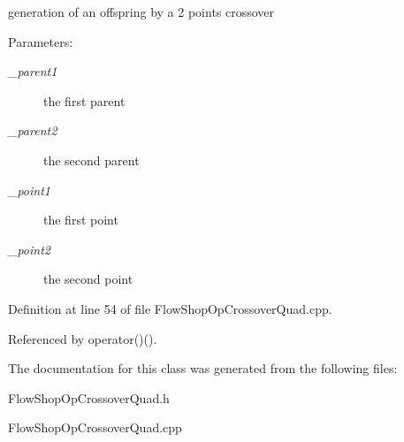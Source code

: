 generation of an offspring by a 2 points crossover 

\begin{Desc}
\item[Parameters:]
\begin{description}
\item[{\em \_\-parent1}]the first parent \item[{\em \_\-parent2}]the second parent \item[{\em \_\-point1}]the first point \item[{\em \_\-point2}]the second point \end{description}
\end{Desc}


Definition at line 54 of file Flow\-Shop\-Op\-Crossover\-Quad.cpp.

Referenced by operator()().

The documentation for this class was generated from the following files:\begin{CompactItemize}
\item 
Flow\-Shop\-Op\-Crossover\-Quad.h\item 
Flow\-Shop\-Op\-Crossover\-Quad.cpp\end{CompactItemize}
